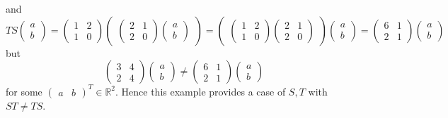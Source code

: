 \documentclass[
	12pt, %
]{fphw}
\newcommand\0{\mathbf{0}}
\newcommand\qed{\text{$\blacksquare$}}
\newcommand\R[1]{\text{$\mathbb{R}^{#1}$}}
\begin{document}
and 
$$
TS \begin{pmatrix}a \\ b\end{pmatrix} = \begin{pmatrix}1 & 2\\1 & 0\end{pmatrix}\begin{pmatrix}\begin{pmatrix}2 & 1\\2 & 0\end{pmatrix}\begin{pmatrix}a \\ b\end{pmatrix}\end{pmatrix} = \begin{pmatrix}\begin{pmatrix}1 & 2\\1 & 0\end{pmatrix}\begin{pmatrix}2 & 1\\2 & 0\end{pmatrix}\end{pmatrix}\begin{pmatrix}a \\ b\end{pmatrix} = \begin{pmatrix}6 & 1 \\ 2 & 1\end{pmatrix} \begin{pmatrix}a \\ b\end{pmatrix}
$$
but
$$
\begin{pmatrix}3&4\\2&4\end{pmatrix}\begin{pmatrix}a \\ b\end{pmatrix} \ne \begin{pmatrix}6 & 1 \\ 2 & 1\end{pmatrix} \begin{pmatrix}a \\ b\end{pmatrix}
$$
for some $\begin{pmatrix}a & b\end{pmatrix}^T \in \R{2}$. Hence this example provides a case of $S,T$ with $ST \ne TS$. \qed

\end{document}
